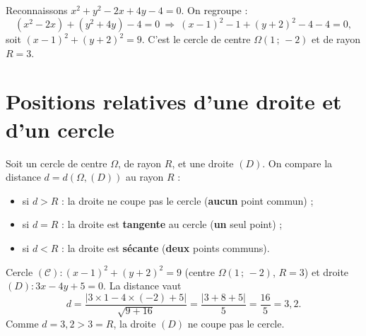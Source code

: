 \begin{exemple}
Reconnaissons $x^2+y^2-2x+4y-4=0$. On regroupe :
\[ (x^2-2x)+(y^2+4y)-4=0 \ \Longrightarrow\ (x-1)^2-1+(y+2)^2-4-4=0, \]
soit $(x-1)^2+(y+2)^2=9$. C'est le cercle de centre $\Omega(1\,;\,-2)$ et de rayon
$R=3$.
\end{exemple}

\section{Positions relatives d'une droite et d'un cercle}

\begin{aretenir}
Soit un cercle de centre $\Omega$, de rayon $R$, et une droite $(D)$. On compare la
distance $d=d(\Omega,(D))$ au rayon $R$ :
\begin{itemize}
  \item si $d>R$ : la droite ne coupe pas le cercle (\textbf{aucun} point commun) ;
  \item si $d=R$ : la droite est \textbf{tangente} au cercle (\textbf{un} seul point) ;
  \item si $d<R$ : la droite est \textbf{sécante} (\textbf{deux} points communs).
\end{itemize}
\end{aretenir}

\begin{illus}
\end{illus}

\begin{exemple}
Cercle $(\mathcal{C}):(x-1)^2+(y+2)^2=9$ (centre $\Omega(1\,;\,-2)$, $R=3$) et
droite $(D):3x-4y+5=0$. La distance vaut
\[ d=\frac{|3\times 1-4\times(-2)+5|}{\sqrt{9+16}}=\frac{|3+8+5|}{5}=\frac{16}{5}=3{,}2. \]
Comme $d=3{,}2>3=R$, la droite $(D)$ ne coupe pas le cercle.
\end{exemple}


